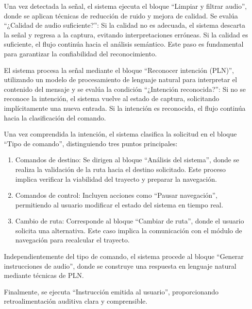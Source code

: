 Una vez detectada la señal, el sistema ejecuta el bloque “Limpiar y filtrar audio”, donde se aplican técnicas de reducción de ruido y mejora de calidad.
Se evalúa “¿Calidad de audio suficiente?”:
Si la calidad no es adecuada, el sistema descarta la señal y regresa a la captura, evitando interpretaciones erróneas.
Si la calidad es suficiente, el flujo continúa hacia el análisis semántico.
Este paso es fundamental para garantizar la confiabilidad del reconocimiento.

El sistema procesa la señal mediante el bloque “Reconocer intención (PLN)”, utilizando un modelo de procesamiento de lenguaje natural para interpretar el contenido del mensaje y se evalúa la condición “¿Intención reconocida?”:
Si no se reconoce la intención, el sistema vuelve al estado de captura, solicitando implícitamente una nueva entrada.
Si la intención es reconocida, el flujo continúa hacia la clasificación del comando.

Una vez comprendida la intención, el sistema clasifica la solicitud en el bloque “Tipo de comando”, distinguiendo tres puntos principales:
\begin{enumerate}
    \item Comandos de destino: Se dirigen al bloque “Análisis del sistema”, donde se realiza la validación de la ruta hacia el destino solicitado. Este proceso implica verificar la viabilidad del trayecto y preparar la navegación.
    \item Comandos de control: Incluyen acciones como “Pausar navegación”, permitiendo al usuario modificar el estado del sistema en tiempo real.
    \item Cambio de ruta: Corresponde al bloque “Cambiar de ruta”, donde el usuario solicita una alternativa. Este caso implica la comunicación con el módulo de navegación para recalcular el trayecto.
\end{enumerate}
Independientemente del tipo de comando, el sistema procede al bloque “Generar instrucciones de audio”, donde se construye una respuesta en lenguaje natural mediante técnicas de PLN.

Finalmente, se ejecuta “Instrucción emitida al usuario”, proporcionando retroalimentación auditiva clara y comprensible.